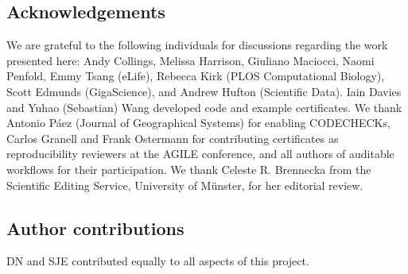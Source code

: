 \documentclass[12pt]{article}
\begin{document}
\subsection*{Acknowledgements}\label{acknowledgements}


We are grateful to the following individuals for discussions regarding
the work presented here: Andy Collings, Melissa Harrison, Giuliano
Maciocci, Naomi Penfold, Emmy Tsang (eLife), Rebecca Kirk (PLOS
Computational Biology), Scott Edmunds (GigaScience), and Andrew Hufton
(Scientific Data). Iain Davies and Yuhao (Sebastian) Wang developed
code and example certificates.  We thank Antonio P\'{a}ez (Journal of
Geographical Systems) for enabling CODECHECKs, Carlos Granell and
Frank Ostermann for contributing certificates as reproducibility
reviewers at the AGILE conference, and all authors of auditable
workflows for their participation.  We thank Celeste R. Brennecka from
the Scientific Editing Service, University of M\"unster, for her
editorial review.

\subsection*{Author contributions}

DN and SJE contributed equally to all aspects of this project.

{\small
}
\end{document}
